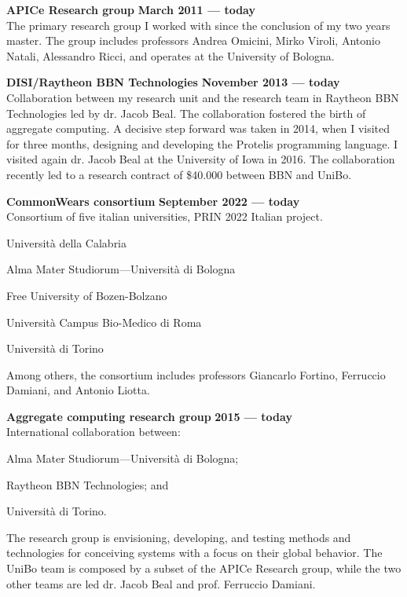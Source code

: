 \textbf{APICe Research group} \hfill \textbf{March 2011 --- today}\\
The primary research group I worked with since the conclusion of my two years master. The group includes professors Andrea Omicini, Mirko Viroli, Antonio Natali, Alessandro Ricci, and operates at the University of Bologna.

\halfblankline{}

\textbf{DISI/Raytheon BBN Technologies} \hfill \textbf{November 2013 --- today}\\
Collaboration between my research unit and the research team in Raytheon BBN Technologies led by dr. Jacob Beal. The collaboration fostered the birth of aggregate computing. A decisive step forward was taken in 2014, when I visited for three months, designing and developing the Protelis programming language. I visited again dr. Jacob Beal at the University of Iowa in 2016. The collaboration recently led to a research contract of \$40.000 between BBN and UniBo.

\halfblankline{}

\textbf{CommonWears consortium} \hfill \textbf{September 2022 --- today}\\
Consortium of five italian universities, PRIN 2022 Italian project.
\begin{innerlist}
    \item Università della Calabria
    \item Alma Mater Studiorum---Università di Bologna
    \item Free University of Bozen-Bolzano
    \item Università Campus Bio-Medico di Roma
    \item Università di Torino
\end{innerlist}
Among others, the consortium includes professors Giancarlo Fortino, Ferruccio Damiani, and Antonio Liotta.

\halfblankline{}

\textbf{Aggregate computing research group} \hfill \textbf{2015 --- today}\\
International collaboration between:
\begin{innerlist}
    \item Alma Mater Studiorum---Università di Bologna;
    \item Raytheon BBN Technologies; and
    \item Università di Torino.
\end{innerlist}
The research group is envisioning, developing, and testing methods and technologies for conceiving systems with a focus on their global behavior. The UniBo team is composed by a subset of the APICe Research group, while the two other teams are led dr. Jacob Beal and prof. Ferruccio Damiani.

